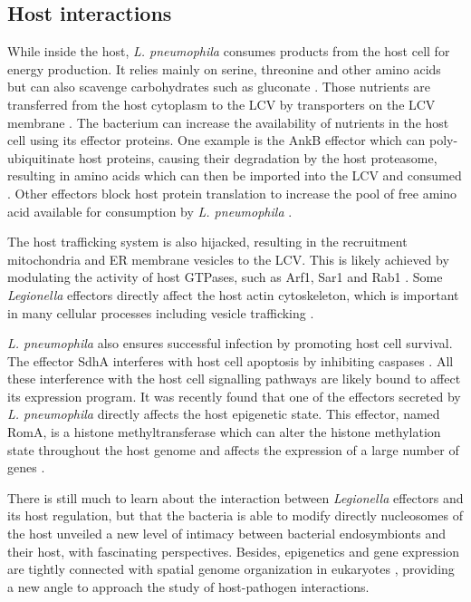 \subsection{Host interactions}

While inside the host, \textit{L. pneumophila} consumes products from the host cell for energy production. It relies mainly on serine, threonine and other amino acids but can also scavenge carbohydrates such as gluconate \cite{bruggemannVirulenceStrategiesInfecting2006}. Those nutrients are transferred from the host cytoplasm to the LCV by transporters on the LCV membrane \cite{wielandIntracellularMultiplicationLegionella2005}. The bacterium can increase the availability of nutrients in the host cell using its effector proteins. One example is the AnkB effector which can poly-ubiquitinate host proteins, causing their degradation by the host proteasome, resulting in amino acids which can then be imported into the LCV and consumed \cite{priceMolecularMimicryFBox2009}. Other effectors block host protein translation to increase the pool of free amino acid available for consumption by \textit{L. pneumophila} \cite{deleonPositiveNegativeRegulation2017}.

The host trafficking system is also hijacked, resulting in the recruitment mitochondria and \acrfull{ER} membrane vesicles to the LCV. This is likely achieved by modulating the activity of host GTPases, such as Arf1, Sar1 and Rab1 \cite{isbergLegionellaPneumophilaReplication2009}. Some \textit{Legionella} effectors directly affect the host actin cytoskeleton, which is important in many cellular processes including vesicle trafficking \citep{liuLegionellaEffectorDisrupts2017,francoLegionellaPneumophilaEffector2012}.

\textit{L. pneumophila} also ensures successful infection by promoting host cell survival. The effector SdhA interferes with host cell apoptosis by inhibiting caspases \cite{lagunaLegionellaPneumophilatranslocatedSubstrate2006}. All these interference with the host cell signalling pathways are likely bound to affect its expression program. It was recently found that one of the effectors secreted by \textit{L. pneumophila} directly affects the host epigenetic state. This effector, named RomA, is a histone methyltransferase which can alter the histone methylation state throughout the host genome and affects the expression of a large number of genes \cite{rolandoLegionellaPneumophilaEffector2013}.

There is still much to learn about the interaction between \textit{Legionella} effectors and its host regulation, but that the bacteria is able to modify directly nucleosomes of the host unveiled a new level of intimacy between bacterial endosymbionts and their host, with fascinating perspectives. Besides, epigenetics and gene expression are tightly connected with spatial genome organization in eukaryotes \cite{dixonChromatinDomainsUnit2016,schneiderDynamicsInterplayNuclear2007}, providing a new angle to approach the study of host-pathogen interactions.

